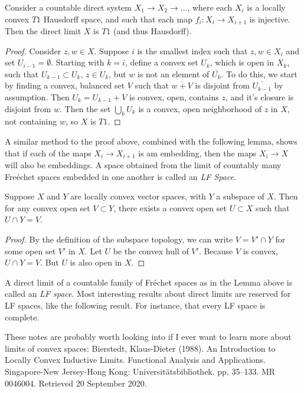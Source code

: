\begin{lemma}
    Consider a countable direct system $X_1 \to X_2 \to \dots$, where each $X_i$ is a locally convex $T1$ Hausdorff space, and such that each map $f_i: X_i \to X_{i+1}$ is injective. Then the direct limit $X$ is $T1$ (and thus Hausdorff).
\end{lemma}
\begin{proof}
    Consider $z,w \in X$. Suppose $i$ is the smallest index such that $z,w \in X_i$ and set $U_{i-1} = \emptyset$. Starting with $k = i$, define a convex set $U_k$, which is open in $X_k$, such that $U_{k-1} \subset U_k$, $z \in U_k$, but $w$ is not an element of $\overline{U_k}$. To do this, we start by finding a convex, balanced set $V$ such that $\overline{w + V}$ is disjoint from $\overline{U_{k-1}}$ by assumption. Then $U_k = U_{k-1} + V$ is convex, open, contains $z$, and it's closure is disjoint from $w$. Then the set $\bigcup_k U_k$ is a convex, open neighborhood of $z$ in $X$, not containing $w$, so $X$ is $T1$.
\end{proof}

A similar method to the proof above, combined with the following lemma, shows that if each of the maps $X_i \to X_{i+1}$ is am embedding, then the maps $X_i \to X$ will also be embeddings. A space obtained from the limit of countably many Fre\'{e}chet spaces embedded in one another is called an \emph{LF Space}.

\begin{lemma}
    Suppose $X$ and $Y$ are locally convex vector spaces, with $Y$ a subspace of $X$. Then for any convex open set $V \subset Y$, there exists a convex open set $U \subset X$ such that $U \cap Y = V$.
\end{lemma}
\begin{proof}
    By the definition of the subspace topology, we can write $V = V' \cap Y$ for some open set $V'$ in $X$. Let $U$ be the convex hull of $V'$. Because $V$ is convex, $U \cap Y = V$. But $U$ is also open in $X$.
\end{proof}

A direct limit of a countable family of Fr\'{e}chet spaces as in the Lemma above is called an \emph{LF space}. Most interesting results about direct limits are reserved for LF spaces, like the following result. For instance, that every LF space is complete.

These notes are probably worth looking into if I ever want to learn more about limits of convex spaces: Bierstedt, Klaus-Dieter (1988). An Introduction to Locally Convex Inductive Limits. Functional Analysis and Applications. Singapore-New Jersey-Hong Kong: Universitätsbibliothek. pp. 35–133. MR 0046004. Retrieved 20 September 2020.









